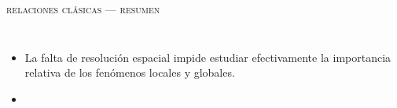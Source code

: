 \documentclass[xcolor=dvipsnames,4pt,fleqn,hyperref={colorlinks,citecolor=black,linkcolor=black,urlcolor=black}]{beamer}
\begin{document}
\begin{frame}{\textsc{relaciones clásicas --- resumen}}%

\begin{columns}
\begin{itemize}
\setlength\itemsep{0.5em}

\item[] La falta de resolución espacial impide estudiar efectivamente la importancia relativa de los
fenómenos locales y globales.

\item[]

\end{itemize}


\end{columns}
\end{frame}
\end{document}
